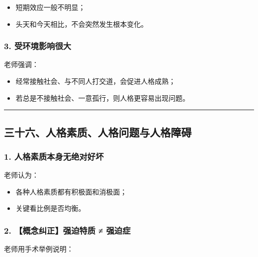 \documentclass[
  chinese,
  9pt,
  a4paper,
]{ctexart}
\providecommand{\tightlist}{%
  \setlength{\itemsep}{0pt}\setlength{\parskip}{0pt}}
\begin{document}
\begin{itemize}
\tightlist
\item
  短期效应一般不明显；
\item
  头天和今天相比，不会突然发生根本变化。
\end{itemize}

\subsubsection{3.
受环境影响很大}\label{ux53d7ux73afux5883ux5f71ux54cdux5f88ux5927}

老师强调：

\begin{itemize}
\tightlist
\item
  经常接触社会、与不同人打交道，会促进人格成熟；
\item
  若总是不接触社会、一意孤行，则人格更容易出现问题。
\end{itemize}

\begin{center}\rule{0.5\linewidth}{0.5pt}\end{center}

\subsection{三十六、人格素质、人格问题与人格障碍}\label{ux4e09ux5341ux516dux4ebaux683cux7d20ux8d28ux4ebaux683cux95eeux9898ux4e0eux4ebaux683cux969cux788d}

\subsubsection{1.
人格素质本身无绝对好坏}\label{ux4ebaux683cux7d20ux8d28ux672cux8eabux65e0ux7eddux5bf9ux597dux574f}

老师认为：

\begin{itemize}
\tightlist
\item
  各种人格素质都有积极面和消极面；
\item
  关键看比例是否均衡。
\end{itemize}

\subsubsection{2. 【概念纠正】强迫特质 ≠
强迫症}\label{ux6982ux5ff5ux7ea0ux6b63ux5f3aux8febux7279ux8d28-ux5f3aux8febux75c7}

老师用手术举例说明：
\end{document}
